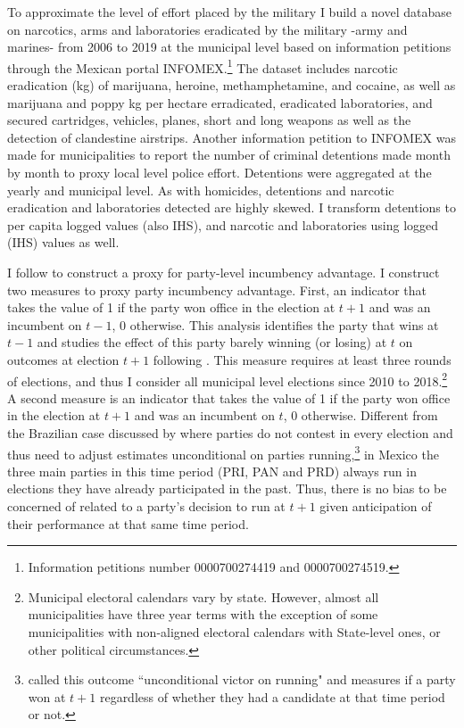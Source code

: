 \documentclass[12pt]{amsart}
\numberwithin{equation}{section}
\theoremstyle{definition}
\theoremstyle{definition}
\theoremstyle{definition}
\begin{document}
To approximate the level of effort placed by the military I build a novel database on narcotics, arms and laboratories eradicated by the military -army and marines- from 2006 to 2019 at the municipal level  based on information petitions through the Mexican portal INFOMEX.\footnote{Information petitions number 0000700274419 and 0000700274519.} The dataset includes narcotic eradication (kg) of marijuana, heroine, methamphetamine, and cocaine, as well as marijuana and poppy kg per hectare erradicated, eradicated laboratories, and secured cartridges, vehicles, planes, short and long weapons as well as the detection of clandestine airstrips. %
Another information petition to INFOMEX was made for municipalities to report the number of criminal detentions made month by month to proxy local level police effort. Detentions were aggregated at the yearly and municipal level. As with homicides, detentions and narcotic eradication and laboratories detected are highly skewed. I transform detentions to per capita logged values (also IHS), and narcotic and laboratories using logged (IHS) values as well. 

I follow \citet{klasnja_titiunik_2017} to construct  a proxy for party-level incumbency advantage. %
I construct two measures to proxy party incumbency advantage. First, an indicator that takes the value of 1 if the party won office in the election at $t+1$ and was an incumbent on $t-1$, 0 otherwise. This analysis identifies the party that wins at $t-1$ and studies the effect of this party barely winning (or losing) at $t$ on outcomes at election $t+1$ following \citet{klasnja_titiunik_2017}. This measure requires at least three rounds of elections, and thus I consider all municipal level elections since 2010 to 2018.\footnote{Municipal electoral calendars vary by state. However, almost all municipalities have three year terms with the exception of some municipalities with non-aligned electoral calendars with State-level ones, or other political circumstances.} A second measure is an indicator that takes the value of 1 if the party won office in the election at $t+1$ and was an incumbent on $t$, 0 otherwise. Different from the Brazilian case discussed by \citet{klasnja_titiunik_2017} where parties do not contest in every election and thus need to adjust estimates unconditional on parties running,\footnote{\citet{klasnja_titiunik_2017} called this outcome ``unconditional victor on running" and measures if a party won at $t+1$ regardless of whether they had a candidate at that time period or not.} in Mexico the three main parties in this time period (PRI, PAN and PRD) always run in elections they have already participated in the past. Thus, there is no bias to be concerned of related to a party's decision to run at $t+1$ given anticipation of their performance at that same time period.  
\end{document}
